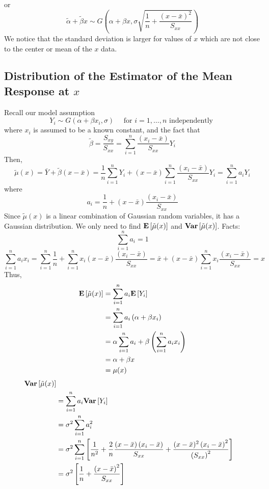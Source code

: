 or
\[\tilde{\alpha}+\tilde{\beta} x \sim G\left(\alpha+\beta x,
    \sigma \sqrt{\frac{1}{n}+\frac{(x-\bar{x})^{2}}{S_{x x}}}\right)\]
We notice that the standard deviation is larger for values
of $ x $ which are not close to the center or mean of the $ x $ data.

\subsection{Distribution of the Estimator of the Mean Response at $ x $}
Recall our model assumption
\[Y_{i} \sim G\left(\alpha+\beta x_{i}, \sigma\right)
    \quad \text { for } i=1, \ldots, n \text { independently }\]
where $ x_i $ is assumed to be a known constant, and the fact that
\[\tilde{\beta}=\frac{S_{x y}}{S_{x x}}=\sum_{i=1}^{n} \frac{\left(x_{i}-\bar{x}\right)}{S_{x x}} Y_{i}\]
Then,
\[\tilde{\mu}(x)=\bar{Y}+\tilde{\beta}(x-\bar{x})=\frac{1}{n} \sum_{i=1}^{n} Y_{i}+(x-\bar{x})
    \sum_{i=1}^{n} \frac{\left(x_{i}-\bar{x}\right)}{S_{x x}} Y_{i}=\sum_{i=1}^{n} a_{i} Y_{i}\]
where
\[a_{i}=\frac{1}{n}+(x-\bar{x}) \frac{\left(x_{i}-\bar{x}\right)}{S_{x x}}\]
Since $ \tilde{\mu}(x) $ is a linear combination of Gaussian random variables, it has a Gaussian
distribution. We only need to find $ \bm{\mathrm{E}}\left[\tilde{\mu}(x)\right] $ and $ \bm{\mathrm{Var}}\left[\tilde{\mu}(x)\right] $.
Facts:
\[ \sum\limits_{i=1}^{n} a_i=1 \]
\[ \sum\limits_{i=1}^{n} a_ix_i=\sum\limits_{i=1}^{n} \frac{1}{n} +
    \sum\limits_{i=1}^{n} x_i\left( x-\bar{x} \right)\frac{(x_i-\bar{x})}{S_{xx}}
    =\bar{x}+\left( x-\bar{x} \right)\sum\limits_{i=1}^{n} x_i \frac{\left( x_i-\bar{x} \right)}{S_{xx}}=x  \]
Thus,
\[
    \begin{aligned}
        \bm{\mathrm{E}}\left[\tilde{\mu}(x)\right]
         & =\sum\limits_{i=1}^{n} a_i\bm{\mathrm{E}}\left[Y_i\right]                                                  \\
         & =\sum\limits_{i=1}^{n} a_i\left( \alpha+\beta x_i \right)                          \\
         & =\alpha \sum\limits_{i=1}^{n} a_i+\beta\left( \sum\limits_{i=1}^{n} a_ix_i \right) \\
         & =\alpha+\beta x                                                                    \\
         & =\mu(x)
    \end{aligned}
\]
\[
    \begin{aligned}
        \bm{\mathrm{Var}}\left[\tilde{\mu}(x)\right]                                                                                                  \\
         & =\sum\limits_{i=1}^{n} a_i\bm{\mathrm{Var}}\left[Y_i\right]                                                                                \\
         & =\sigma^2 \sum\limits_{i=1}^{n} a_i^2                                                                              \\
         & =\sigma^{2} \sum_{i=1}^{n}\left[\frac{1}{n^{2}}+\frac{2}{n} \frac{(x-\bar{x})\left(x_{i}-\bar{x}\right)}{S_{x x}}+
            \frac{(x-\bar{x})^{2}\left(x_{i}-\bar{x}\right)^{2}}{\left(S_{x x}\right)^{2}}\right]                             \\
         & =\sigma^2\left[ \frac{1}{n} +\frac{\left( x-\bar{x} \right)^2}{S_{xx}}  \right]
    \end{aligned}
\]

